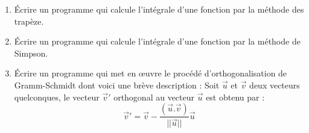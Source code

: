\begin{enumerate}
    \item Écrire un programme qui calcule l'intégrale d'une fonction par la méthode des trapèze.
    
    \item Écrire un programme qui calcule l'intégrale d'une fonction par la méthode de Simpson.
    
    \item Écrire un programme qui met en œuvre le procédé d'orthogonalisation de Gramm-Schmidt dont voici une brève description : Soit $\vec{u}$ et $\vec{v}$ deux vecteurs quelconques, le vecteur $\vec{v}'$ orthogonal au vecteur $\vec{u}$ est obtenu par :
    \begin{equation*}
        \vec{v}' = \vec{v} - \frac{(\vec{u}.\vec{v})}{||\vec{u}||} \vec{u}
    \end{equation*}
\end{enumerate}

    
